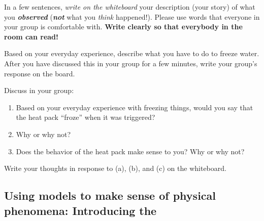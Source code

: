\begin{benumerate}
	In a few sentences, \emph{write on the whiteboard} your description (your story) of what you \textbf{\emph{observed}} (\textbf{\emph{not}} what you \emph{think} happened!). Please use words that everyone in your group is comfortable with. \textbf{Write clearly so that everybody in the room can read!}
	
	
	Based on your everyday experience, describe what you have to do to freeze water. After you have discussed this in your group for a few minutes, write your group's response on the board.
	
	
	
	Discuss in your group:
	\begin{enumerate}
		\item Based on your everyday experience with freezing things, would you say that the heat pack ``froze'' when it was triggered?
		\item Why or why not?
		\item Does the behavior of the heat pack make sense to you? Why or why not?
	\end{enumerate}
	Write your thoughts in response to (a), (b), and (c) on the whiteboard.

\WCD

\end{benumerate}


\subsection[Using models to make sense of physical phenomena]{Using models to make sense of physical phenomena: Introducing the \ThreePhaseModel{}}

